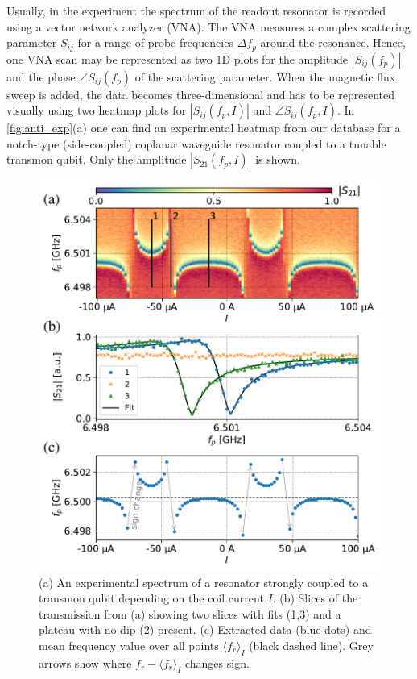 \documentclass[%
 aip,
 amsmath,amssymb,
 reprint,%
]{revtex4-1}
\begin{document}
Usually, in the experiment the spectrum of the readout resonator is recorded using a vector network analyzer (VNA).  The VNA measures a complex scattering parameter $S_{ij}$ for a range of probe frequencies $\Delta f_p$ around the resonance. Hence, one VNA scan may be represented as two 1D plots for the amplitude $|S_{ij}(f_p)|$ and the phase $\angle S_{ij}(f_p)$ of the scattering parameter. When the magnetic flux sweep is added, the data becomes three-dimensional and has to be represented visually using two heatmap plots for $|S_{ij}(f_p, I)|$ and $\angle S_{ij}(f_p, I)$. In \autoref{fig:anti_exp}(a) one can find an experimental heatmap from our database for a notch-type (side-coupled) coplanar waveguide resonator coupled to a tunable transmon qubit. Only the amplitude $|S_{21}(f_p, I)|$ is shown.
\begin{figure}[h!]
\includegraphics[width=\linewidth]{anti_subplots}
\caption{(a) An experimental spectrum of a resonator strongly coupled to a transmon qubit depending on the coil current $I$. (b) Slices of the transmission from (a) showing two slices with fits (1,3) and a plateau with no dip (2) present. (c) Extracted data (blue dots) and mean frequency value over all points $\langle f_r \rangle_{I}$ (black dashed line). Grey arrows show where $f_r - \langle f_r \rangle_{I}$ changes sign.}
\label{fig:anti_exp}
\end{figure}
\end{document}
